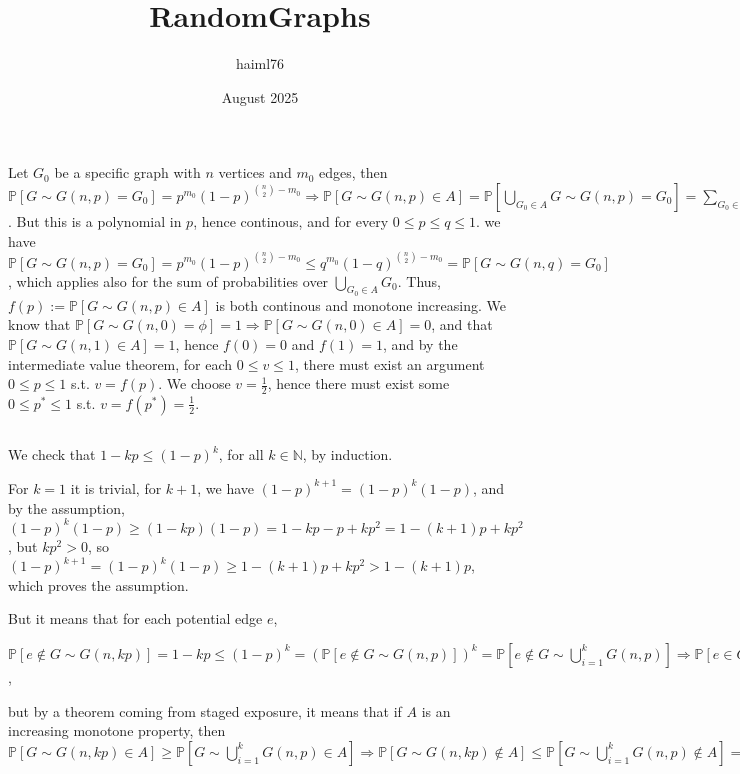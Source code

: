 \documentclass{article}
\title{RandomGraphs}
\author{haiml76 }
\date{August 2025}
\begin{document}
\maketitle

\section{}
\subsection{}
Let $G_0$ be a specific graph with $n$ vertices and $m_0$ edges, then $\mathbb{P}[G\sim{G(n,p)}=G_0]=p^{m_0}(1-p)^{\binom{n}{2}-m_0}\Rightarrow{\mathbb{P}[G\sim{G(n,p)}\in{A}]}=\mathbb{P}[\bigcup_{G_0\in{A}}G\sim{G(n,p)}=G_0]=\sum_{G_0\in{A}}p^{m_0}(1-p)^{\binom{n}{2}-m_0}$. But this is a polynomial in $p$, hence continous, and for every $0\leq{p\leq{q}}\leq{1}$. we have $\mathbb{P}[G\sim{G(n,p)}=G_0]=p^{m_0}(1-p)^{\binom{n}{2}-m_0}\leq{q^{m_0}(1-q)^{\binom{n}{2}-m_0}}=\mathbb{P}[G\sim{G(n,q)}=G_0]$, which applies also for the sum of probabilities over $\bigcup_{G_0\in{A}}G_0$. Thus, $f(p):=\mathbb{P}[G\sim{G(n,p)}\in{A}]$ is both continous and monotone increasing. We know that $\mathbb{P}[G\sim{G(n,0)}=\phi]=1\Rightarrow{\mathbb{P}[G\sim{G(n,0)}\in{A}]=0}$, and that $\mathbb{P}[G\sim{G(n,1)}\in{A}]=1$, hence $f(0)=0$ and $f(1)=1$, and by the intermediate value theorem, for each $0\leq{v}\leq{1}$, there must exist an argument $0\leq{p}\leq{1}$ s.t. $v=f(p)$. We choose $v=\frac{1}{2}$, hence there must exist some $0\leq{p^{\ast}}\leq{1}$ s.t. $v=f(p^{\ast})=\frac{1}{2}.$
\subsection{}
We check that $1-kp\leq{(1-p)^k}$, for all $k\in\mathbb{N}$, by induction.

For $k=1$ it is trivial, for $k+1$, we have $(1-p)^{k+1}=(1-p)^k(1-p)$, and by the assumption, $(1-p)^k(1-p)\geq{(1-kp)(1-p)}=1-kp-p+kp^2=1-(k+1)p+kp^2$, but $kp^2>0$, so $(1-p)^{k+1}=(1-p)^k(1-p)\geq{1-(k+1)p+kp^2}>1-(k+1)p$, which proves the assumption.

But it means that for each potential edge $e$, 

$\mathbb{P}[e\notin{G\sim{G(n,kp)}}]=1-kp\leq(1-p)^k=(\mathbb{P}[e\notin{G\sim{G(n,p)}}])^k=\mathbb{P}[e\notin{G\sim\bigcup_{i=1}^{k}G(n,p)}]\Rightarrow{\mathbb{P}[e\in{G\sim{G(n,kp)}}]\geq{\mathbb{P}[e\in{G\sim\bigcup_{i=1}^{k}G(n,p)]}}}$, 

but by a theorem coming from staged exposure, it means that if $A$ is an increasing monotone property, then $\mathbb{P}[G\sim{G(n,kp)}\in{A}]\geq{\mathbb{P}[G\sim\bigcup_{i=1}^{k}G(n,p)\in{A}]}\Rightarrow{\mathbb{P}[G\sim{G(n,kp)}\notin{A}]\leq{\mathbb{P}[G\sim\bigcup_{i=1}^{k}G(n,p)\notin{A}]}=(\mathbb{P}[G\sim{G(n,p)}\notin{A}]})^k$
\end{document}
